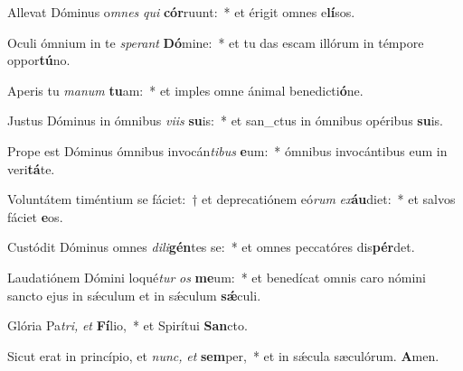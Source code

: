 \item Allevat Dóminus o\textit{mnes} \textit{qui} \textbf{cór}ruunt:~* et érigit omnes e\textbf{lí}sos.
\item Oculi ó\-mnium in te \textit{sperant} \textbf{Dó}mine:~* et tu das escam illórum in témpore oppor\textbf{tú}no.
\item Aperis tu \textit{manum} \textbf{tu}am:~* et imples omne ánimal benedicti\textbf{ó}ne.
\item Justus Dóminus in ómnibus \textit{viis} \textbf{su}is:~* et san\_ctus in ómnibus opéribus \textbf{su}is.
\item Prope est Dóminus ómnibus invocán\textit{tibus} \textbf{e}um:~* ómnibus invocántibus eum in veri\textbf{tá}te.
\item Voluntátem timéntium se fáciet:~† et deprecatiónem eó\textit{rum} \textit{ex}\textbf{áu}diet:~* et salvos fáciet \textbf{e}os.
\item Custódit Dóminus omnes \textit{dili}\textbf{gén}tes se:~* et omnes peccatóres dis\textbf{pér}det.
\item Laudatiónem Dómini loqué\tinyhspace\textit{tur} \textit{os} \textbf{me}um:~* et benedícat omnis caro nómini sancto ejus in sǽculum et in sǽculum \textbf{sǽ}culi.
\item Glória Pa\tinyhspace\textit{tri,} \textit{et} \textbf{Fí}lio,~* et Spirítui \textbf{San}cto.
\item Sicut erat in princípio, et \textit{nunc,} \textit{et} \textbf{sem}per,~* et in sǽcula sæculórum. \textbf{A}men.